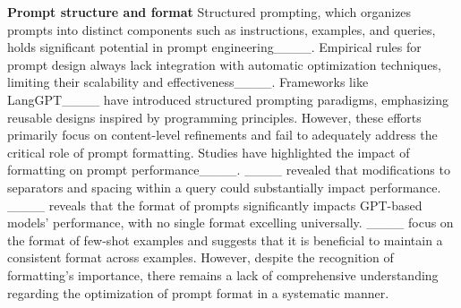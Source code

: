 \noindent \textbf{Prompt structure and format}
Structured prompting, which organizes prompts into distinct components such as instructions, examples, and queries, holds significant potential in prompt engineering____.
Empirical rules for prompt design always lack integration with automatic optimization techniques, limiting their scalability and effectiveness____.
Frameworks like LangGPT____ have introduced structured prompting paradigms, emphasizing reusable designs inspired by programming principles.
However, these efforts primarily focus on content-level refinements and fail to adequately address the critical role of prompt formatting.
Studies have highlighted the impact of formatting on prompt performance____.
____ revealed that modifications to separators and spacing within a query could substantially impact performance.
____ 
reveals that the format of prompts significantly impacts GPT-based models’ performance, with no single format excelling universally.
____ focus on the format of few-shot examples and suggests that it is beneficial to maintain a consistent format across examples.
However, despite the recognition of formatting's importance, there remains a lack of comprehensive understanding regarding the optimization of prompt format in a systematic manner. 




